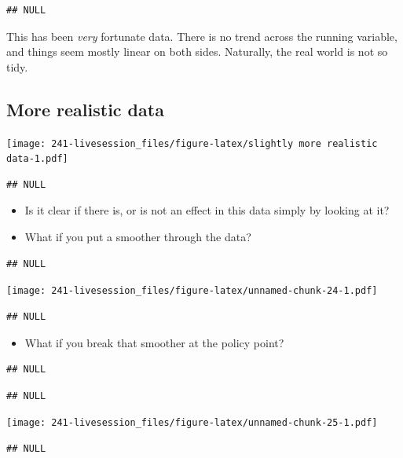 \documentclass[
]{book}
\providecommand{\tightlist}{%
  \setlength{\itemsep}{0pt}\setlength{\parskip}{0pt}}
\begin{document}
\begin{verbatim}
## NULL
\end{verbatim}

This has been \emph{very} fortunate data. There is no trend across the
running variable, and things seem mostly linear on both sides.
Naturally, the real world is not so tidy.

\hypertarget{more-realistic-data}{%
\subsection{More realistic data}\label{more-realistic-data}}

\texttt{[image: 241-livesession\_files/figure-latex/slightly more realistic data-1.pdf]}

\begin{verbatim}
## NULL
\end{verbatim}

\begin{itemize}
\item
  Is it clear if there is, or is not an effect in this data simply by
  looking at it?
\item
  What if you put a smoother through the data?
\end{itemize}

\begin{verbatim}
## NULL
\end{verbatim}

\texttt{[image: 241-livesession\_files/figure-latex/unnamed-chunk-24-1.pdf]}

\begin{verbatim}
## NULL
\end{verbatim}

\begin{itemize}
\tightlist
\item
  What if you break that smoother at the policy point?
\end{itemize}

\begin{verbatim}
## NULL
\end{verbatim}

\begin{verbatim}
## NULL
\end{verbatim}

\texttt{[image: 241-livesession\_files/figure-latex/unnamed-chunk-25-1.pdf]}

\begin{verbatim}
## NULL
\end{verbatim}
\end{document}

